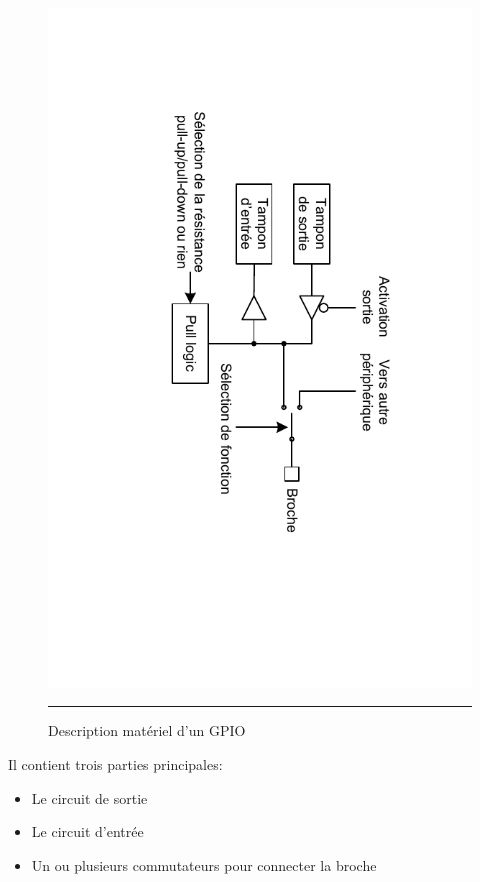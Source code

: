 \begin{figure}[htb]
  \centering
  \includegraphics[angle=90, trim = 25mm 0mm 15mm 0mm, clip, width=14cm]{./Figures/gpio/Port.pdf}
  \rule{35em}{0.5pt}
  \caption[port GPIO]{Description matériel d'un GPIO}
  \label{fig:gpio}
\end{figure}

Il contient trois parties principales:
\begin{itemize}[label=\textbullet,font=\small]
\item Le circuit de sortie
\item Le circuit d'entrée
\item Un ou plusieurs commutateurs pour connecter la broche
\end{itemize}

